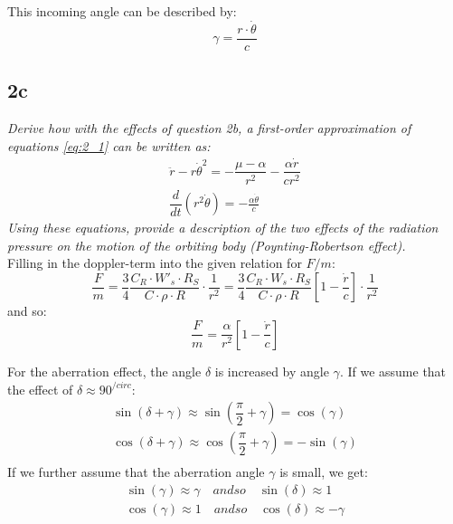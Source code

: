 This incoming angle can be described by:
\begin{equation}
    \gamma = \frac{r \cdot \dot{\theta}}{c}
\end{equation}


\subsection{2c}
\textit{Derive how with the effects of question 2b, a first-order approximation of equations \ref{eq:2_1} can be written as:}
\begin{equation}
\begin{split}
    \ddot{r}-r\dot{\theta} ^{2} = -\dfrac {\mu -\alpha }{r^{2}}-\dfrac {\alpha \dot{r}}{cr^{2}} \\
     \dfrac {d}{dt}\left( r^{2}\dot{\theta} \right) = -\frac{\alpha \dot{\theta}}{c}
\end{split}
\end{equation}
\textit{Using these equations, provide a description of the two effects of the radiation pressure on the motion of the orbiting body (Poynting-Robertson effect).} \\

Filling in the doppler-term into the given relation for $F/m$:
\begin{equation}
    \dfrac {F}{m}=\dfrac {3}{4}\dfrac {C_{R}\cdot W'_{s}\cdot R_{S}}{C\cdot \rho\cdot R}\cdot \dfrac {1}{r^{2}} = \dfrac {3}{4}\dfrac {C_{R}\cdot W_s \cdot R_{S}}{C\cdot \rho \cdot R} \left[ 1-\dfrac {\dot{r}}{c}\right]  \cdot \dfrac {1}{r^{2}}
\end{equation}
and so:
\begin{equation}
    \dfrac {F}{m}=\dfrac {\alpha }{r^{2}}\left[ 1-\dfrac {\dot{r}}{c}\right] 
\end{equation}

For the aberration effect, the angle $\delta$ is increased by angle $\gamma$. If we assume that the effect of $\delta \approx 90^{/circ}$:
\begin{equation}
\begin{split}
    \sin \left( \delta +\gamma \right) \approx \sin \left( \dfrac {\pi }{2}+\gamma \right) = \cos ( \gamma ) \\
    \cos \left( \delta +\gamma \right) \approx \cos \left( \dfrac {\pi }{2}+\gamma \right) = - \sin ( \gamma ) \\
\end{split}
\end{equation}
If we further assume that the aberration angle $\gamma$ is small, we get:
\begin{equation}
\begin{split}
    \sin ( \gamma ) \approx \gamma \quad and so \quad \sin(\delta) \approx 1 \\
    \cos ( \gamma ) \approx 1 \quad and so \quad \cos(\delta) \approx -\gamma \\
\end{split}
\end{equation}

